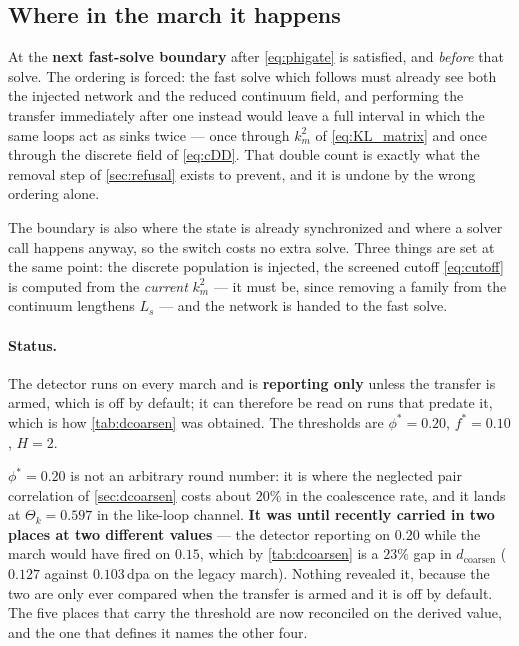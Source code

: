 \documentclass{article}
\begin{document}
\subsection{Where in the march it happens}
\label{sec:trigger-timing}

At the \textbf{next fast-solve boundary} after \cref{eq:phigate} is satisfied, and
\emph{before} that solve. The ordering is forced: the fast solve which follows
must already see both the injected network and the reduced continuum field, and
performing the transfer immediately after one instead would leave a full interval
in which the same loops act as sinks twice --- once through $k^2_m$ of
\cref{eq:KL_matrix} and once through the discrete field of \cref{eq:cDD}. That
double count is exactly what the removal step of \cref{sec:refusal} exists to
prevent, and it is undone by the wrong ordering alone.

The boundary is also where the state is already synchronized and where a solver
call happens anyway, so the switch costs no extra solve. Three things are set at
the same point: the discrete population is injected, the screened cutoff
\cref{eq:cutoff} is computed from the \emph{current} $k^2_m$ --- it must be, since
removing a family from the continuum lengthens $L_s$ --- and the network is handed
to the fast solve.

\paragraph{Status.} The detector runs on every march and is \textbf{reporting
only} unless the transfer is armed, which is off by default; it can therefore be
read on runs that predate it, which is how \cref{tab:dcoarsen} was obtained. The
thresholds are $\phi^\ast=0.20$, $f^\ast=0.10$, $H=2$.

$\phi^\ast=0.20$ is not an arbitrary round number: it is where the neglected pair
correlation of \cref{sec:dcoarsen} costs about $20\%$ in the coalescence rate, and
it lands at $\Theta_k=0.597$ in the like-loop channel. \textbf{It was until
recently carried in two places at two different values} --- the detector
reporting on $0.20$ while the march would have fired on $0.15$, which by
\cref{tab:dcoarsen} is a $23\%$ gap in $d_{\mathrm{coarsen}}$ ($0.127$ against
$0.103\,$dpa on the legacy march). Nothing revealed it, because the two are only
ever compared when the transfer is armed and it is off by default. The five
places that carry the threshold are now reconciled on the derived value, and the
one that defines it names the other four.
\end{document}
